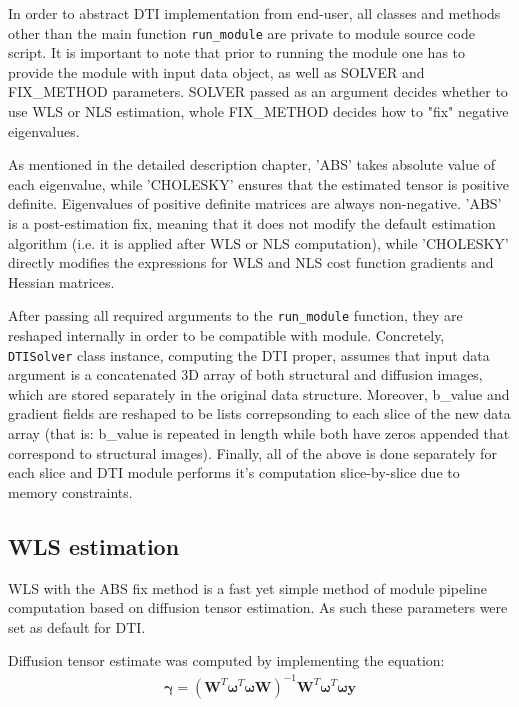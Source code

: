In order to abstract DTI implementation from end-user, all classes and methods other than the main function \texttt{run\_module} are private to module source code script. It is important to note that prior to running the module one has to provide the module with input data object, as well as SOLVER and FIX\_METHOD parameters. SOLVER passed as an argument decides whether to use WLS or NLS estimation, whole FIX\_METHOD decides how to "fix" negative eigenvalues. 

As mentioned in the detailed description chapter, 'ABS' takes absolute value of each eigenvalue, while 'CHOLESKY' ensures that the estimated tensor is positive definite. Eigenvalues of positive definite matrices are always non-negative. 'ABS' is a post-estimation fix, meaning that it does not modify the default estimation algorithm (i.e. it is applied after WLS or NLS computation), while 'CHOLESKY' directly modifies the expressions for WLS and NLS cost function gradients and Hessian matrices.

After passing all required arguments to the \texttt{run\_module} function, they are reshaped internally in order to be compatible with module. Concretely, \texttt{DTISolver} class instance, computing the DTI proper, assumes that input data argument is a concatenated 3D array of both structural and diffusion images, which are stored separately in the original data structure. Moreover, b\_value and gradient fields are reshaped to be lists correpsonding to each slice of the new data array (that is: b\_value is repeated in length while both have zeros appended that correspond to structural images). Finally, all of the above is done separately for each slice and DTI module performs it's computation slice-by-slice due to memory constraints.

\subsection{WLS estimation}

WLS with the ABS fix method is a fast yet simple method of module pipeline computation based on diffusion tensor estimation. As such these parameters were set as default for DTI.

Diffusion tensor estimate was computed by implementing the equation:
\begin{equation}
\begin{aligned}
\boldsymbol{\gamma}=\left(\boldsymbol{W}^T\boldsymbol{\omega}^T\boldsymbol{\omega}\boldsymbol{W}\right)^{-1}\boldsymbol{W}^T\boldsymbol{\omega}^T\boldsymbol{\omega y}
\end{aligned}
\label{Eq:m6_impl_eq_1}
\end{equation}

